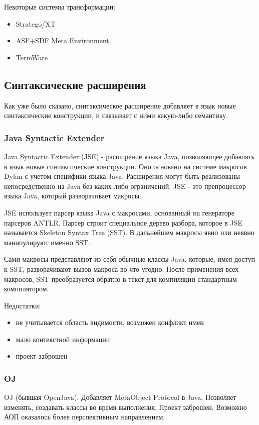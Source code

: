 \documentclass[a4paper,12pt]{article}
\begin{document}
Некоторые системы трансформации:
\begin{itemize}
  \item Stratego/XT
  \item ASF+SDF Meta Environment
  \item TermWare
\end{itemize}

\subsection{Синтаксические расширения}
Как уже было сказано, синтаксическое расширение добавляет в язык новые
синтаксические конструкции, и связывает с ними какую-либо семантику.

\subsubsection{Java Syntactic Extender}
Java Syntactic Extender (JSE) - расширение языка Java, позволяющее добавлять в
язык новые синтаксические конструкции. Оно основано на системе макросов Dylan с
учетом специфики языка Java. Расширения могут быть реализованы
непосредственно на Java без каких-либо ограничений. JSE - это
препроцессор языка Java, который разворачивает макросы.

JSE использует парсер языка Java с макросами, основанный на генераторе парсеров
ANTLR. Парсер строит специальное дерево разбора, которое в JSE называется
Skeleton Syntax Tree (SST). В дальнейшем макросы явно или неявно манипулируют
именно SST.

Сами макросы представляют из себя обычные классы Java, которые, имея доступ к
SST, разворачивают вызов макроса во что угодно. После применения всех макросов,
SST преобразуется обратно в текст для компиляции стандартным компилятором.

Недостатки:
\begin{itemize}
 \item не учитывается область видимости, возможен конфликт имен
 \item мало контекстной информации
 \item проект заброшен
\end{itemize}

\subsubsection{OJ}
OJ (бывшая OpenJava). Добавляет MetaObject Protocol в Java.
Позволяет изменять, создавать классы во время выполнения.
Проект заброшен. Возможно АОП оказалось более перспективным направлением.
\end{document}
